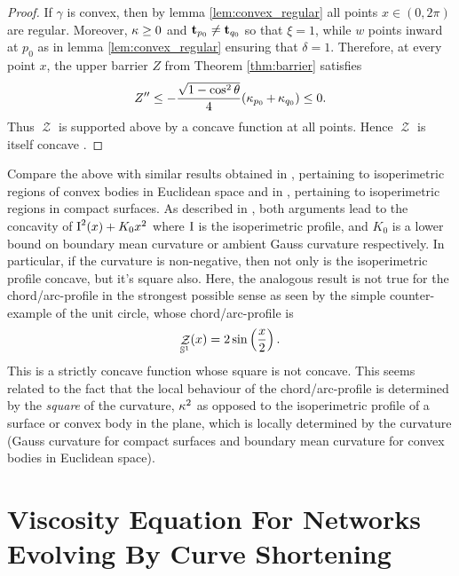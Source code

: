 \documentclass[11pt]{amsart}
\DeclareMathOperator{\chordarcprofile}{\mathcal{Z}}
\begin{document}
\begin{proof}
If $\gamma$ is convex, then by lemma \ref{lem:convex_regular} all points $x \in (0, 2\pi)$ are regular. Moreover, $\operatorname{\kappa} \geq 0$ and $\operatorname{\mathbf{t}}_{p_0} \ne \operatorname{\mathbf{t}}_{q_0}$ so that $\xi = 1$, while \(w\) points inward at $p_0$ as in lemma \ref{lem:convex_regular} ensuring that $\delta = 1$. Therefore, at every point $x$, the upper barrier $Z$ from Theorem \ref{thm:barrier} satisfies
\[
Z'' \leq - \frac{\sqrt{1-\cos^2 \theta}}{4} (\operatorname{\kappa}_{p_0} + \operatorname{\kappa}_{q_0}) \leq 0.
\]
Thus $\chordarcprofile$ is supported above by a concave function at all points. Hence $\chordarcprofile$ is itself concave \cite[Lemma 2.7]{MR1674097}.
\end{proof}

\begin{remark}
Compare the above with similar results obtained in \cite{MR1674097}, pertaining to isoperimetric regions of convex bodies in Euclidean space and in \cite{MR875084}, pertaining to isoperimetric regions in compact surfaces. As described in \cite{pbthesis}, both arguments lead to the concavity of $\operatorname{I}^2(x) + K_0 x^2$ where $\operatorname{I}$ is the isoperimetric profile, and $K_0$ is a lower bound on boundary mean curvature or ambient Gauss curvature respectively. In particular, if the curvature is non-negative, then not only is the isoperimetric profile concave, but it's square also. Here, the analogous result is not true for the chord/arc-profile in the strongest possible sense as seen by the simple counter-example of the unit circle, whose chord/arc-profile is
\[
\chordarcprofile_{\sphere^1} (x) = 2 \sin \left(\frac{x}{2}\right).
\]
This is a strictly concave function whose square is not concave. This seems related to the fact that the local behaviour of the chord/arc-profile is determined by the \emph{square} of the curvature, $\operatorname{\kappa}^2$ as opposed to the isoperimetric profile of a surface or convex body in the plane, which is locally determined by the curvature (Gauss curvature for compact surfaces and boundary mean curvature for convex bodies in Euclidean space).
\end{remark}

\section{Viscosity Equation For Networks Evolving By Curve Shortening}
\label{sec:viscosity_csf}
\end{document}
